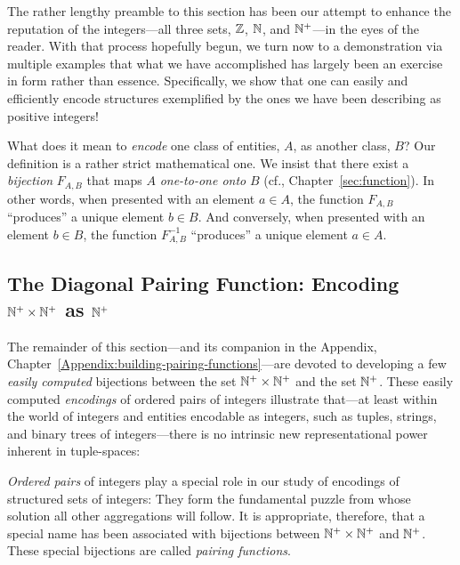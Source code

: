 \bigskip

The rather lengthy preamble to this section has been our attempt to enhance the reputation of the integers---all three sets, $\mathbb{Z}$, $\mathbb{N}$, and $\mathbb{N}^+$---in the eyes of the reader.  With that process hopefully begun, we turn now to a demonstration via multiple examples that what we have accomplished has largely been an exercise in form rather than essence.  Specifically, we show that one can easily and efficiently encode structures exemplified by the ones we have been describing as positive integers!

\medskip

 
\noindent
What does it mean to {\em encode} one class of entities, $A$, as another class, $B$?  Our definition is a rather strict mathematical one.  We insist that there exist a {\em bijection} $F_{A,B}$ that maps $A$ {\em one-to-one onto} $B$ (cf., Chapter~\ref{sec:function}).  In other words, when presented with an element $a \in A$, the function $F_{A,B}$ ``produces'' a unique element $b \in B$.  And conversely, when presented with an element $b \in B$, the function $F^{-1}_{A,B}$ ``produces'' a unique element $a \in A$.

\subsection{The Diagonal Pairing Function: Encoding $\mathbb{N}^+ \times \mathbb{N}^+$ as $\mathbb{N}^+$}
\label{sec:building-pairing-functions}
\label{sec:diag-pair-fn}


The remainder of this section---and its companion in the Appendix, Chapter~\ref{Appendix:building-pairing-functions}---are devoted to developing a few {\em easily computed} bijections between the set $\mathbb{N}^+ \times \mathbb{N}^+$ and the set $\mathbb{N}^+$.  These easily computed {\em encodings} of ordered pairs of integers illustrate that---at least within the world of integers and entities encodable as integers, such as tuples, strings, and binary trees of integers---there is no intrinsic new representational power inherent in tuple-spaces: 

\smallskip

{\em Ordered pairs} of integers play a special role in our study of encodings of structured sets of integers:  They form the fundamental puzzle from whose solution all other aggregations will follow.  It is appropriate, therefore, that a special name has been associated with bijections between $\mathbb{N}^+ \times \mathbb{N}^+$ and $\mathbb{N}^+$.  These special bijections are called {\it pairing functions}. 

